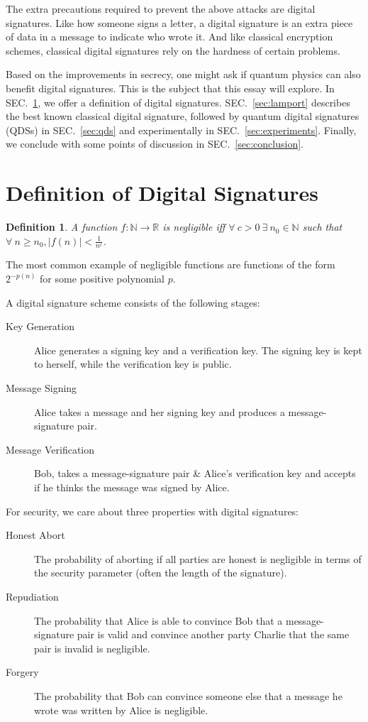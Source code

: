\documentclass[%
 reprint,
 amsmath,amssymb,
 aps,
 pra,
]{revtex4-1}
\newtheorem{definition}{Definition}[section]
\begin{document}
The extra precautions required to prevent the above attacks are digital signatures. Like how someone signs a letter, a digital signature is an extra piece of data in a message to indicate who wrote it. And like classical encryption schemes, classical digital signatures rely on the hardness of certain problems.

Based on the improvements in secrecy, one might ask if quantum physics can also benefit digital signatures. This is the subject that this essay will explore. In SEC.\ \ref{sec:def}, we offer a definition of digital signatures. SEC.\ \ref{sec:lamport} describes the best known classical digital signature, followed by quantum digital signatures (QDSs) in SEC.\ \ref{sec:qds} and experimentally in SEC.\ \ref{sec:experiments}. Finally, we conclude with some points of discussion in SEC.\ \ref{sec:conclusion}.

\section{Definition of Digital Signatures}
\label{sec:def}

\begin{definition}
A function $f:\mathbb{N}\rightarrow\mathbb{R}$ is negligible iff $\forall~ c > 0 ~\exists~ n_0 \in \mathbb{N}$ such that $\forall~ n \geq n_0, |f(n)| < \frac{1}{n^c}$.
\end{definition}

The most common example of negligible functions are functions of the form $2^{-p(n)}$ for some positive polynomial $p$.

A digital signature scheme consists of the following stages:

\begin{description}
\item[Key Generation]Alice generates a signing key and a verification key. The signing key is kept to herself, while the verification key is public.
\item[Message Signing]Alice takes a message and her signing key and produces a message-signature pair.
\item[Message Verification]Bob, takes a message-signature pair \& Alice's verification key and accepts if he thinks the message was signed by Alice.
\end{description}

For security, we care about three properties with digital signatures:

\begin{description}
\item[Honest Abort]The probability of aborting if all parties are honest is negligible in terms of the security parameter (often the length of the signature).
\item[Repudiation]The probability that Alice is able to convince Bob that a message-signature pair is valid and convince another party Charlie that the same pair is invalid is negligible.
\item[Forgery]The probability that Bob can convince someone else that a message he wrote was written by Alice is negligible.
\end{description}
\end{document}
